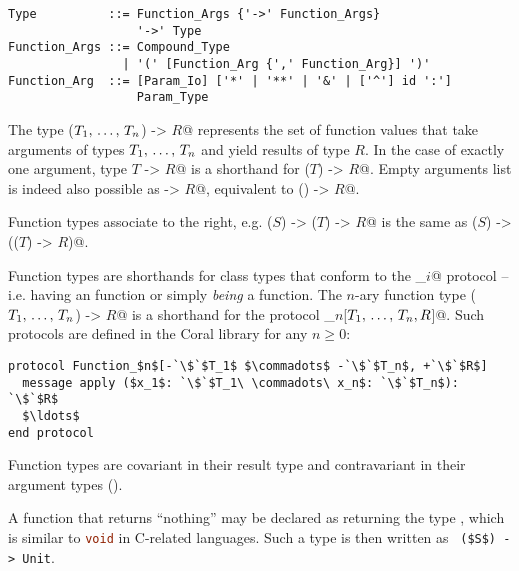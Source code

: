 \syntax\begin{lstlisting}
Type          ::= Function_Args {'->' Function_Args}
                  '->' Type
Function_Args ::= Compound_Type
                | '(' [Function_Arg {',' Function_Arg}] ')'
Function_Arg  ::= [Param_Io] ['*' | '**' | '&' | ['^'] id ':']
                  Param_Type
\end{lstlisting}

The type \lstinline@($T_1 ,\, \ldots ,\, T_n$) -> $R$@ represents the set of function values that take arguments of types $T_1 ,\, \ldots ,\, T_n$ and yield results of type $R$. In the case of exactly one argument, type \lstinline@$T$ -> $R$@ is a shorthand for \lstinline@($T$) -> $R$@. Empty arguments list is indeed also possible as \lstinline@-> $R$@, equivalent to \lstinline@() -> $R$@.

Function types associate to the right, e.g. \lstinline@($S$) -> ($T$) -> $R$@ is the same as \lstinline@($S$) -> (($T$) -> $R$)@. 

Function types are shorthands for class types that conform to the \lstinline@Function_$i$@ protocol -- i.e. having an  function or simply {\em being} a function. The $n$-ary function type \lstinline@($T_1 ,\, \ldots ,\, T_n$) -> $R$@ is a shorthand for the protocol \lstinline@Function_$n$[$T_1 ,\, \ldots ,\, T_n,R$]@. Such protocols are defined in the Coral library for any $n \ge 0$:

\begin{lstlisting}[escapechar=`]
protocol Function_$n$[-`\$`$T_1$ $\commadots$ -`\$`$T_n$, +`\$`$R$]
  message apply ($x_1$: `\$`$T_1\ \commadots\ x_n$: `\$`$T_n$): `\$`$R$
  $\ldots$
end protocol
\end{lstlisting}

Function types are covariant in their result type and contravariant in their argument types ().

A function that returns ``nothing'' may be declared as returning the type , which is similar to \lstinline[language=C]!void! in C-related languages. Such a type is then written as ~\lstinline!($S$) -> Unit!. 

